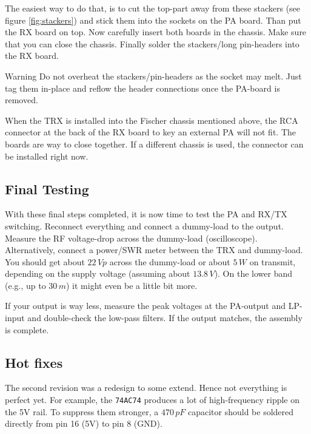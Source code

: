 \documentclass[10pt, a4paper,twoside]{scrartcl}
\newenvironment{warning}{\begin{bclogo}[couleur=red!30,arrondi=.1,logo=\bcattention,ombre=true]{Warning}}{\end{bclogo}}
\begin{document}
The easiest way to do that, is to cut the top-part away from these stackers (see figure \ref{fig:stackers}) and stick them into the sockets on the PA board. Than put the RX board on top. Now carefully insert both boards in the chassis. Make sure that you can close the chassis. Finally solder the stackers/long pin-headers into the RX board. 

\begin{warning}
Do not overheat the stackers/pin-headers as the socket may melt. Just tag them in-place and reflow the header connections once the PA-board is removed.
\end{warning}

When the TRX is installed into the Fischer chassis mentioned above, the RCA connector at the back of the RX board to key an external PA will not fit. The boards are way to close together. If a different chassis is used, the connector can be installed right now.


\subsection{Final Testing}
With these final steps completed, it is now time to test the PA and RX/TX switching. Reconnect everything and connect a dummy-load to the output. Measure the RF voltage-drop across the dummy-load (oscilloscope). Alternatively, connect a power/SWR meter between the TRX and dummy-load. You should get about $22\,Vp$ across the dummy-load or about $5\,W$ on transmit, depending on the supply voltage (assuming about $13.8\,V$). On the lower band (e.g., up to $30\,m$) it might even be a little bit more. 

If your output is way less, measure the peak voltages at the PA-output and LP-input and double-check the low-pass filters. If the output matches, the assembly is complete. 

\subsection{Hot fixes}
The second revision was a redesign to some extend. Hence not everything is perfect yet. For example, the \texttt{74AC74} produces a lot of high-frequency ripple on the 5V rail. To suppress them stronger, a $470\,pF$ capacitor should be soldered directly from pin 16 (5V) to pin 8 (GND).  

\clearpage
\end{document}
